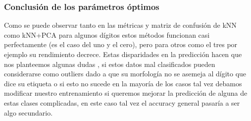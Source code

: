 \subsubsection{Conclusión de los parámetros óptimos}


Como se puede observar tanto en las métricas y matriz de confusión de kNN como kNN+PCA para algunos dígitos estos métodos funcionan casi perfectamente (es el caso del uno y el cero), pero para otros como el tres por ejemplo su rendimiento decrece. Estas disparidades en la predicción hacen que nos planteemos algunas dudas , si estos datos mal clasificados pueden  considerarse como outliers dado a que su morfología no se asemeja al dígito que dice su etiqueta o si esto no sucede en la mayoría de los casos tal vez debamos modificar nuestro entrenamiento si queremos mejorar la predicción de alguna de estas clases complicadas, en este caso tal vez el accuracy general pasaría a ser algo secundario.

